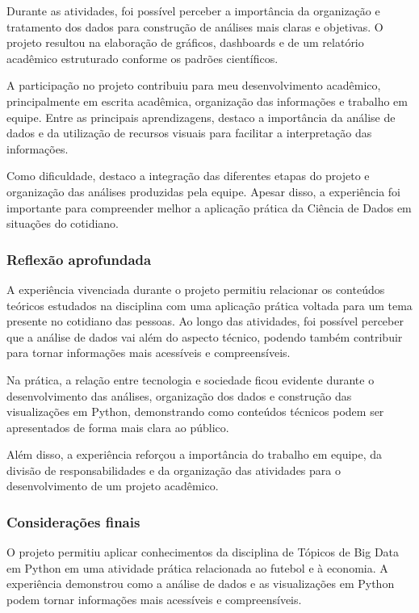 \documentclass[12pt, a4paper, brazil]{article}
\begin{document}
Durante as atividades, foi possível perceber a importância da organização e tratamento dos dados para construção de análises mais claras e objetivas. O projeto resultou na elaboração de gráficos, dashboards e de um relatório acadêmico estruturado conforme os padrões científicos.

A participação no projeto contribuiu para meu desenvolvimento acadêmico, principalmente em escrita acadêmica, organização das informações e trabalho em equipe. Entre as principais aprendizagens, destaco a importância da análise de dados e da utilização de recursos visuais para facilitar a interpretação das informações.

Como dificuldade, destaco a integração das diferentes etapas do projeto e organização das análises produzidas pela equipe. Apesar disso, a experiência foi importante para compreender melhor a aplicação prática da Ciência de Dados em situações do cotidiano.

\subsubsection{Reflexão aprofundada}
A experiência vivenciada durante o projeto permitiu relacionar os conteúdos teóricos estudados na disciplina com uma aplicação prática voltada para um tema presente no cotidiano das pessoas. Ao longo das atividades, foi possível perceber que a análise de dados vai além do aspecto técnico, podendo também contribuir para tornar informações mais acessíveis e compreensíveis.

Na prática, a relação entre tecnologia e sociedade ficou evidente durante o desenvolvimento das análises, organização dos dados e construção das visualizações em Python, demonstrando como conteúdos técnicos podem ser apresentados de forma mais clara ao público.

Além disso, a experiência reforçou a importância do trabalho em equipe, da divisão de responsabilidades e da organização das atividades para o desenvolvimento de um projeto acadêmico.

\subsubsection{Considerações finais}
O projeto permitiu aplicar conhecimentos da disciplina de Tópicos de Big Data em Python em uma atividade prática relacionada ao futebol e à economia. A experiência demonstrou como a análise de dados e as visualizações em Python podem tornar informações mais acessíveis e compreensíveis.
\end{document}
